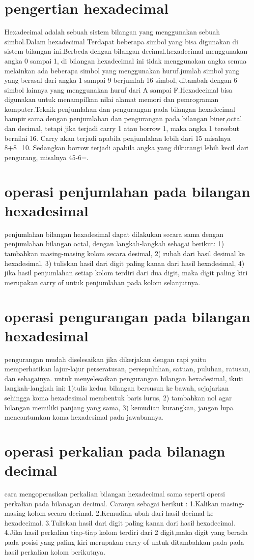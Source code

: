 \section{pengertian hexadecimal}
	Hexadecimal adalah sebuah sistem bilangan yang menggunakan sebuah simbol.Dalam hexadecimal Terdapat beberapa simbol yang bisa digunakan di sistem bilangan ini.Berbeda dengan bilangan decimal.hexadecimal menggunakan angka 0 sampai 1, di bilangan hexadecimal ini tidak menggunakan angka semua melainkan ada beberapa simbol yang menggunakan huruf.jumlah simbol yang yang berasal dari angka 1 sampai 9 berjumlah 16 simbol, ditambah dengan 6 simbol lainnya yang menggunakan huruf dari A sampai F.Hexadecimal bisa digunakan untuk menampilkan nilai alamat memori dan pemrograman komputer.Teknik penjumlahan dan pengurangan pada bilangan hexadecimal hampir sama dengan penjumlahan dan pengurangan pada bilangan biner,octal dan decimal, tetapi jika terjadi carry 1 atau borrow 1, maka angka 1 tersebut bernilai 16. Carry akan terjadi apabila penjumlahan lebih dari 15 misalnya 8+8=10. Sedangkan borrow terjadi apabila angka yang dikurangi lebih kecil dari pengurang, misalnya 45-6=.
\section{operasi penjumlahan pada bilangan hexadesimal}
penjumlahan bilangan hexadesimal dapat dilakukan secara sama dengan penjumlahan bilangan octal, dengan langkah-langkah sebagai berikut: 1) tambahkan masing-masing kolom secara desimal, 2) rubah dari hasil desimal ke hexadesimal, 3) tuliskan hasil dari digit paling kanan dari hasil hexadesimal, 4) jika hasil penjumlahan setiap kolom terdiri dari dua digit, maka digit paling kiri merupakan carry of untuk penjumlahan pada kolom selanjutnya.
\section{operasi pengurangan pada bilangan hexadesimal}
pengurangan mudah diselesaikan jika dikerjakan dengan rapi yaitu memperhatikan lajur-lajur perseratusan, persepuluhan, satuan, puluhan, ratusan, dan sebagainya. untuk menyelesaikan pengurangan bilangan hexadesimal, ikuti langkah-langkah ini: 1)tulis kedua bilangan bersusun ke bawah, sejajarkan sehingga koma hexadesimal membentuk baris lurus, 2) tambahkan nol agar bilangan memiliki panjang yang sama, 3) kemudian kurangkan, jangan lupa mencantumkan koma hexadesimal pada jawabannya.
\section{operasi perkalian pada bilanagn decimal}
cara mengoperasikan perkalian bilangan hexadecimal sama seperti opersi perkalian pada bilanagan decimal. Caranya sebagai berikut :
	1.Kalikan masing-masing kolom secara decimal.
	2.Kemudian ubah dari hasil decimal ke hexadecimal.
	3.Tuliskan hasil dari digit paling kanan dari hasil hexadecimal.
	4.Jika hasil perkalian tiap-tiap kolom terdiri dari 2 digit,maka digit yang berada pada posisi yang paling kiri merupakan carry of untuk ditambahkan pada pada hasil perkalian kolom berikutnya.
